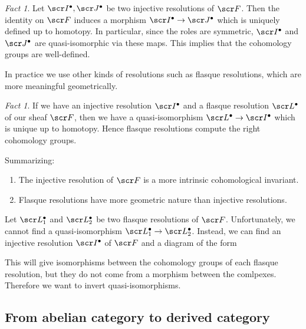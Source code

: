 \documentclass[A4paper, british, reqno]{amsart}
\theoremstyle{darkgreentheorem}
\theoremstyle{darkbluedefinition}
\theoremstyle{darkredexample}
\theoremstyle{remark}
\newtheorem{fact}[thm]{Fact}
\newcommand{\1}{\mathbbm{1}}
\newcommand{\grd}{^{\bullet}}
\begin{document}
\begin{fact}
    Let $\I\grd,\sJ\grd$ be two injective resolutions of $\F$.
    Then the identity on $\F$ induces a morphism $\I\grd\to \sJ\grd$ which is uniquely defined up to homotopy.
    In particular, since the roles are symmetric, $\I\grd$ and $\sJ\grd$ are quasi-isomorphic via these maps.
    This implies that the cohomology groups are well-defined.
\end{fact}

In practice we use other kinds of resolutions such as flasque resolutions, which are more meaningful geometrically.

\begin{fact}
    If we have an injective resolution $\I\grd$ and a flasque resolution $\L\grd$ of our sheaf $\F$, then we have a quasi-isomorphism $\L\grd\to \I\grd$ which is unique up to homotopy.
    Hence flasque resolutions compute the right cohomology groups.
\end{fact}

Summarizing:
\begin{enumerate}
    \item The injective resolution of $\F$ is a more intrinsic cohomological invariant.
    \item Flasque resolutions have more geometric nature than injective resolutions.
\end{enumerate}

Let $\L_{1}\grd$ and $\L_{2}\grd$ be two flasque resolutions of $\F$.
Unfortunately, we cannot find a quasi-isomorphism $\L_{1}\grd\to \L_{2}\grd$.
Instead, we can find an injective resolution $\I\grd$ of $\F$ and a diagram of the form
\begin{center}
\end{center}

This will give isomorphisms between the cohomology groups of each flasque resolution, but they do not come from a morphism between the comlpexes.
Therefore we want to invert quasi-isomorphisms.

\subsection{From abelian category to derived category}
\end{document}

